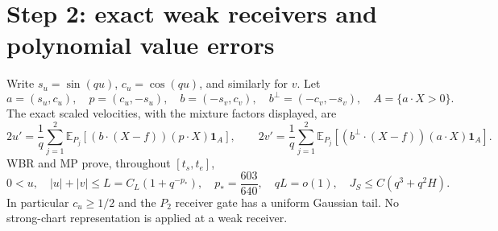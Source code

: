 \documentclass[11pt]{article}
\numberwithin{equation}{section}
\theoremstyle{remark}\newtheorem{remark}[theorem]{Remark}
\newcommand{\E}{\mathbb E}\newcommand{\dd}{\,d}\newcommand{\one}{\mathbf1}
\begin{document}
\section{Step 2: exact weak receivers and polynomial value errors}
\label{an03wcsv1:fieldsection}
Write $s_u=\sin(qu)$, $c_u=\cos(qu)$, and similarly for $v$.
Let
\[
 a=(s_u,c_u),\quad p=(c_u,-s_u),\quad
 b=(-s_v,c_v),\quad b^\perp=(-c_v,-s_v),\quad A=\{a\cdot X>0\}.
\]
The exact scaled velocities, with the mixture factors displayed, are
\begin{equation}
 2u'=\frac1q\sum_{j=1}^2\E_{P_j}[(b\cdot(X-f))(p\cdot X)\one_A],
 \qquad
 2v'=\frac1q\sum_{j=1}^2\E_{P_j}[(b^\perp\cdot(X-f))(a\cdot X)\one_A].
 \label{an03wcsv1:exact}
\end{equation}
WBR and MP prove, throughout $[t_s,t_e]$,
\begin{equation}
 0<u,\quad |u|+|v|\le L=C_L(1+q^{-p_*}),\quad
 p_*=\frac{603}{640},\quad qL=o(1),\quad
 J_S\le C(q^3+q^2H).
 \label{an03wcsv1:chart}
\end{equation}
In particular $c_u\ge1/2$ and the $P_2$ receiver gate has a
uniform Gaussian tail. No strong-chart representation is applied
at a weak receiver.
\end{document}
